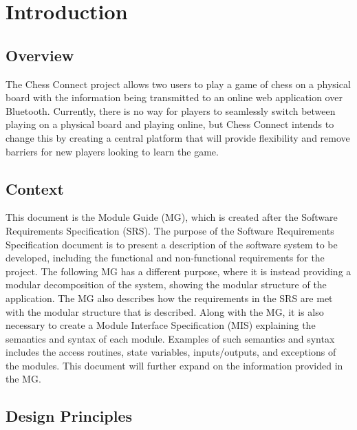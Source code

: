 \documentclass[12pt, titlepage]{article}
\begin{document}
\newpage

\tableofcontents

\listoftables

\listoffigures

\newpage


\section{Introduction}

\subsection{Overview}

The Chess Connect project allows two users to play a game of chess on a physical board with the information being transmitted to an online web application over Bluetooth.
Currently, there is no way for players to seamlessly switch between playing on a physical board and playing online, but Chess Connect intends to change this by creating a central platform that will provide flexibility and remove barriers for new players looking to learn the game.

\subsection{Context}

This document is the Module Guide (MG), which is created after the Software Requirements Specification (SRS). 
The purpose of the Software Requirements Specification document is to present a description of the software system to be developed, including the functional and non-functional requirements for the project. The following MG has a different purpose, where it is instead providing a modular decomposition of the system, showing the modular structure of the application. The MG also describes how the requirements in the SRS are met with the modular structure that is described.
Along with the MG, it is also necessary to create a Module Interface Specification (MIS) explaining the semantics and syntax of each module. Examples of such semantics and syntax includes the access routines, state variables, inputs/outputs, and exceptions of the modules. This document will further expand on the information provided in the MG.

\subsection{Design Principles}
\end{document}
